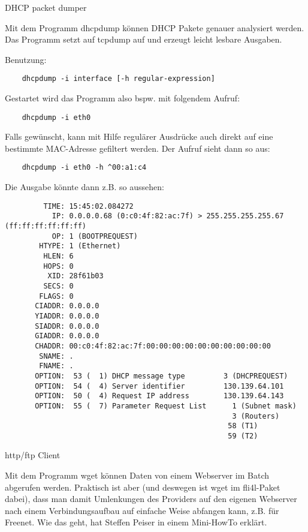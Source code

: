 \begin{description}
 DHCP packet dumper

    Mit dem Programm dhcpdump können DHCP Pakete genauer analysiert werden.
    Das Programm setzt auf tcpdump auf und erzeugt leicht lesbare Ausgaben.

    Benutzung:

\begin{verbatim}
    dhcpdump -i interface [-h regular-expression]
\end{verbatim}

    Gestartet wird das Programm also bspw. mit folgendem Aufruf:

\begin{verbatim}
    dhcpdump -i eth0
\end{verbatim}

    Falls gewünscht, kann mit Hilfe regulärer Ausdrücke auch direkt auf eine
    bestimmte MAC-Adresse gefiltert werden. Der Aufruf sieht dann so aus:

\begin{verbatim}
    dhcpdump -i eth0 -h ^00:a1:c4
\end{verbatim}

    Die Ausgabe könnte dann z.B. so aussehen:

\begin{example}
\begin{verbatim}
         TIME: 15:45:02.084272
           IP: 0.0.0.0.68 (0:c0:4f:82:ac:7f) > 255.255.255.255.67 (ff:ff:ff:ff:ff:ff)
           OP: 1 (BOOTPREQUEST)
        HTYPE: 1 (Ethernet)
         HLEN: 6
         HOPS: 0
          XID: 28f61b03
         SECS: 0
        FLAGS: 0
       CIADDR: 0.0.0.0
       YIADDR: 0.0.0.0
       SIADDR: 0.0.0.0
       GIADDR: 0.0.0.0
       CHADDR: 00:c0:4f:82:ac:7f:00:00:00:00:00:00:00:00:00:00
        SNAME: .
        FNAME: .
       OPTION:  53 (  1) DHCP message type         3 (DHCPREQUEST)
       OPTION:  54 (  4) Server identifier         130.139.64.101
       OPTION:  50 (  4) Request IP address        130.139.64.143
       OPTION:  55 (  7) Parameter Request List      1 (Subnet mask)
                                                     3 (Routers)
                                                    58 (T1)
                                                    59 (T2)
\end{verbatim}
\end{example}

 http/ftp Client

    Mit dem Programm wget können Daten von einem Webserver im Batch
    abgerufen werden. Praktisch ist aber (und deswegen ist wget im
    fli4l-Paket dabei), dass man damit Umlenkungen des Providers auf
    den eigenen Webserver nach einem Verbindungsaufbau auf einfache
    Weise abfangen kann, z.B. für Freenet. Wie das geht, hat Steffen
    Peiser in einem Mini-HowTo erklärt.


\end{description}
